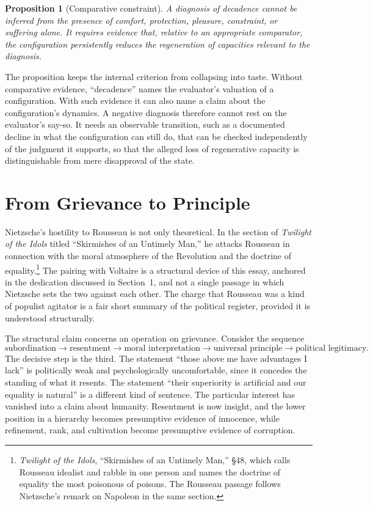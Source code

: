 \documentclass[11pt]{article}
\newtheorem{proposition}{Proposition}
\theoremstyle{definition}
\begin{document}
\begin{proposition}[Comparative constraint]
A diagnosis of decadence cannot be inferred from the presence of comfort, protection, pleasure, constraint, or suffering alone. It requires evidence that, relative to an appropriate comparator, the configuration persistently reduces the regeneration of capacities relevant to the diagnosis.
\end{proposition}

The proposition keeps the internal criterion from collapsing into taste. Without comparative evidence, ``decadence'' names the evaluator's valuation of a configuration. With such evidence it can also name a claim about the configuration's dynamics. A negative diagnosis therefore cannot rest on the evaluator's say-so. It needs an observable transition, such as a documented decline in what the configuration can still do, that can be checked independently of the judgment it supports, so that the alleged loss of regenerative capacity is distinguishable from mere disapproval of the state.

\section{From Grievance to Principle}

Nietzsche's hostility to Rousseau is not only theoretical. In the section of \emph{Twilight of the Idols} titled ``Skirmishes of an Untimely Man,'' he attacks Rousseau in connection with the moral atmosphere of the Revolution and the doctrine of equality.\footnote{\emph{Twilight of the Idols}, ``Skirmishes of an Untimely Man,'' \S48, which calls Rousseau idealist and rabble in one person and names the doctrine of equality the most poisonous of poisons. The Rousseau passage follows Nietzsche's remark on Napoleon in the same section.} The pairing with Voltaire is a structural device of this essay, anchored in the dedication discussed in Section~1, and not a single passage in which Nietzsche sets the two against each other. The charge that Rousseau was a kind of populist agitator is a fair short summary of the political register, provided it is understood structurally.

The structural claim concerns an operation on grievance. Consider the sequence
\[
\text{subordination}
\rightarrow
\text{resentment}
\rightarrow
\text{moral interpretation}
\rightarrow
\text{universal principle}
\rightarrow
\text{political legitimacy}.
\]
The decisive step is the third. The statement ``those above me have advantages I lack'' is politically weak and psychologically uncomfortable, since it concedes the standing of what it resents. The statement ``their superiority is artificial and our equality is natural'' is a different kind of sentence. The particular interest has vanished into a claim about humanity. Resentment is now insight, and the lower position in a hierarchy becomes presumptive evidence of innocence, while refinement, rank, and cultivation become presumptive evidence of corruption.
\end{document}
